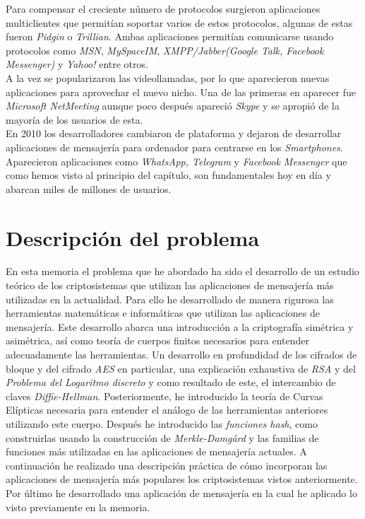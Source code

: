 Para compensar el creciente número de protocolos surgieron aplicaciones multiclientes que permitían soportar varios de estos protocolos, algunas de estas fueron \emph{Pidgin} o \emph{Trillian}. Ambas aplicaciones permitían comunicarse usando protocolos como \emph{MSN}, \emph{MySpaceIM}, \emph{XMPP/Jabber(Google Talk, Facebook Messenger)} y \emph{Yahoo!} entre otros.\\ 
A la vez se popularizaron las videollamadas, por lo que aparecieron nuevas aplicaciones para aprovechar el nuevo nicho. Una de las primeras en aparecer fue \emph{Microsoft NetMeeting} aunque poco después apareció \emph{Skype} y se apropió de la mayoría de los usuarios de esta.\\
En 2010 los desarrolladores cambiaron de plataforma y dejaron de desarrollar aplicaciones de mensajería para ordenador para centrarse en los \emph{Smartphones}. Aparecieron aplicaciones como \emph{WhatsApp, Telegram} y \emph{Facebook Messenger} que como hemos visto al principio del capítulo, son fundamentales hoy en día y abarcan miles de millones de usuarios.

\section{Descripción del problema}
En esta memoria el problema que he abordado ha sido el desarrollo de un estudio teórico de los criptosistemas que utilizan las aplicaciones de mensajería más utilizadas en la actualidad. Para ello he desarrollado de manera rigurosa las herramientas matemáticas e informáticas que utilizan las aplicaciones de mensajería. Este desarrollo abarca una introducción a la criptografía simétrica y asimétrica, así como teoría de cuerpos finitos necesarios para entender adecuadamente las herramientas.
Un desarrollo en profundidad de los cifrados de bloque y del cifrado \emph{AES} en particular, una explicación exhaustiva de \emph{RSA} y del \emph{Problema del Logaritmo discreto} y como resultado de este, el intercambio de claves \emph{Diffie-Hellman}. Posteriormente, he introducido la teoría de Curvas Elípticas necesaria para entender el análogo de las herramientas anteriores utilizando este cuerpo.
Después he introducido las \emph{funciones hash}, como construirlas usando la construcción de \emph{Merkle-Damgård} y las familias de funciones más utilizadas en las aplicaciones de mensajería actuales. A continuación he realizado una descripción práctica de cómo incorporan las aplicaciones de mensajería más populares los criptosistemas vistos anteriormente. Por último he desarrollado una aplicación de mensajería en la cual he aplicado lo visto previamente en la memoria. 

